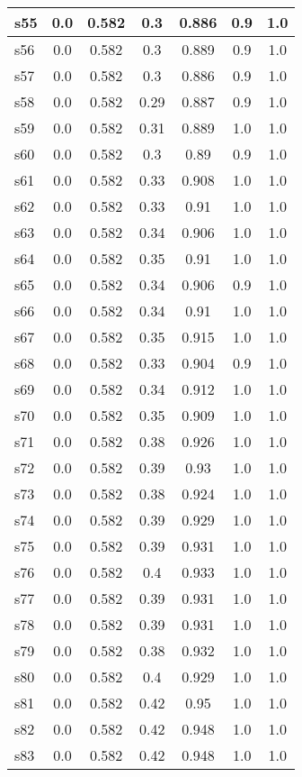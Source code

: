 \documentclass{article}
\begin{document}
\begin{tabular}{|l|c|c|c|c|c|c|}
s55 &0.0 & 0.582 & 0.3 & 0.886 & 0.9 & 1.0\\
\hline
s56 &0.0 & 0.582 & 0.3 & 0.889 & 0.9 & 1.0\\
\hline
s57 &0.0 & 0.582 & 0.3 & 0.886 & 0.9 & 1.0\\
\hline
s58 &0.0 & 0.582 & 0.29 & 0.887 & 0.9 & 1.0\\
\hline
s59 &0.0 & 0.582 & 0.31 & 0.889 & 1.0 & 1.0\\
\hline
s60 &0.0 & 0.582 & 0.3 & 0.89 & 0.9 & 1.0\\
\hline
s61 &0.0 & 0.582 & 0.33 & 0.908 & 1.0 & 1.0\\
\hline
s62 &0.0 & 0.582 & 0.33 & 0.91 & 1.0 & 1.0\\
\hline
s63 &0.0 & 0.582 & 0.34 & 0.906 & 1.0 & 1.0\\
\hline
s64 &0.0 & 0.582 & 0.35 & 0.91 & 1.0 & 1.0\\
\hline
s65 &0.0 & 0.582 & 0.34 & 0.906 & 0.9 & 1.0\\
\hline
s66 &0.0 & 0.582 & 0.34 & 0.91 & 1.0 & 1.0\\
\hline
s67 &0.0 & 0.582 & 0.35 & 0.915 & 1.0 & 1.0\\
\hline
s68 &0.0 & 0.582 & 0.33 & 0.904 & 0.9 & 1.0\\
\hline
s69 &0.0 & 0.582 & 0.34 & 0.912 & 1.0 & 1.0\\
\hline
s70 &0.0 & 0.582 & 0.35 & 0.909 & 1.0 & 1.0\\
\hline
s71 &0.0 & 0.582 & 0.38 & 0.926 & 1.0 & 1.0\\
\hline
s72 &0.0 & 0.582 & 0.39 & 0.93 & 1.0 & 1.0\\
\hline
s73 &0.0 & 0.582 & 0.38 & 0.924 & 1.0 & 1.0\\
\hline
s74 &0.0 & 0.582 & 0.39 & 0.929 & 1.0 & 1.0\\
\hline
s75 &0.0 & 0.582 & 0.39 & 0.931 & 1.0 & 1.0\\
\hline
s76 &0.0 & 0.582 & 0.4 & 0.933 & 1.0 & 1.0\\
\hline
s77 &0.0 & 0.582 & 0.39 & 0.931 & 1.0 & 1.0\\
\hline
s78 &0.0 & 0.582 & 0.39 & 0.931 & 1.0 & 1.0\\
\hline
s79 &0.0 & 0.582 & 0.38 & 0.932 & 1.0 & 1.0\\
\hline
s80 &0.0 & 0.582 & 0.4 & 0.929 & 1.0 & 1.0\\
\hline
s81 &0.0 & 0.582 & 0.42 & 0.95 & 1.0 & 1.0\\
\hline
s82 &0.0 & 0.582 & 0.42 & 0.948 & 1.0 & 1.0\\
\hline
s83 &0.0 & 0.582 & 0.42 & 0.948 & 1.0 & 1.0\\

\end{tabular}
\end{document}
